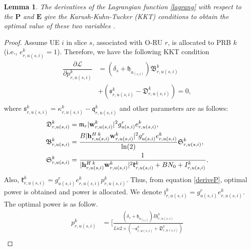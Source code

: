 \documentclass[conference]{IEEEtran}
\newtheorem{lemma}{Lemma}
\begin{document}

\begin{lemma}

The derivatives of the Lagrangian function \eqref{lagrang} with respect to the $\boldsymbol{P}$ and $\boldsymbol{E}$ give the Karush-Kuhn-Tucker (KKT) conditions to obtain the optimal value of these two variables \cite{lee2018dynamic,ali2018joint}.
\end{lemma}
\begin{proof}
Assume UE $i$ in slice $s$, associated with O-RU $r$, is allocated to PRB $k$  (i.e., $e_{r,u(s,i)}^{k} = 1$). Therefore, we have the following KKT condition
\begin{equation}\label{deriveP}
\begin{split}
\dfrac{\partial\mathcal{L}}{\partial p_{r,u(s,i)}^{k}} &= (\delta_s + \mathfrak{h}_{u_{(s,i)}})\mathfrak{B}_{r,u(s,i)}^{k}\\
 &+ (\mathfrak{s}^k_{r,u(s,i)} -\mathfrak{D}_{r,u(s,i)}^{k})=0,\\
\end{split}
\end{equation}
where $ \mathfrak{s}^k_{r,u(s,i)}=\kappa^k_{r,u(s,i)}-\mathfrak{q}^k_{r,u(s,i)}$ and other parameters are as follows:
\begin{equation}
\begin{split}
\mathfrak{D}_{r,u(s,i)}^{k} &= \mathfrak{m}_{r}|\bold{w}_{r,u(s,i)}^{k}|^2 g_{u(s,i)}^r e^k_{r,u(s,i)}, \\
\mathfrak{B}_{r,u(s,i)}^{k} &= \frac{B |{\bold{h}_{r,u(s,i)}^{H \: k}} \bold{w}_{r,u(s,i)}^{k}|^2 g_{u(s,i)}^r e_{r,u(s,i)}^{k}}{\ln(2)} \mathfrak{S}_{r,u(s,i)}^{k},\\
\mathfrak{S}_{r,u(s,i)}^{k} &= \frac{1}{{|\bold{h}_{r,u(s,i)}^{H \: k}} \bold{w}_{r,u(s,i)}^{k}|^2 \mathfrak{k}_{r,u(s,i)}^{k}+BN_0 + I_{r,u(s,i)}^{k}}.\\
\end{split}
\end{equation}
Also, $\mathfrak{k}_{r,u(s,i)}^{k} = g_{u(s,i)}^r e_{r,u(s,i)}^{k}p_{r,u(s,i)}^{k}$.
Thus, from equation \eqref{deriveP}, optimal power is obtained and power is allocated.
We denote $ \mathfrak{j}_{r,u(s,i)}^{k} = g_{u(s,i)}^r e_{r,u(s,i)}^{k}$.
The optimal power is as follow.
\begin{equation}
\begin{split}
p_{r,u(s,i)}^{k} &= [\frac{(\delta_s + \mathfrak{h}_{u_{(s,i)}})B \mathfrak{j}_{r,u(s,i)}^{k}}{ Ln2 \times (-\mathfrak{s}^k_{r,u(s,i)} +\mathfrak{D}_{r,u(s,i)}^{k})}\\

\end{split}
\end{equation}
\end{proof}
\end{document}
